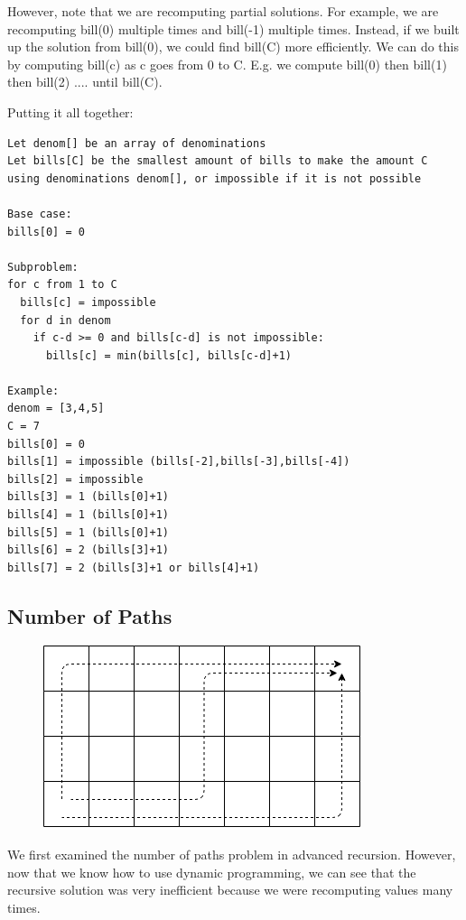 \documentclass[11pt,oneside]{book}
\makeatletter
\def\maxwidth#1{\ifdim\Gin@nat@width>#1 #1\else\Gin@nat@width\fi}
\makeatother
\begin{document}
However, note that we are recomputing partial solutions. For example, we are recomputing bill(0) multiple times and bill(-1) multiple times. Instead, if we built up the solution from bill(0), we could find bill(C) more efficiently. We can do this by computing bill(c) as c goes from 0 to C. E.g. we compute bill(0) then bill(1) then bill(2) .... until bill(C).

Putting it all together:

\begin{lstlisting}
Let denom[] be an array of denominations
Let bills[C] be the smallest amount of bills to make the amount C using denominations denom[], or impossible if it is not possible

Base case:
bills[0] = 0

Subproblem:
for c from 1 to C
  bills[c] = impossible
  for d in denom
    if c-d >= 0 and bills[c-d] is not impossible:
      bills[c] = min(bills[c], bills[c-d]+1)

Example:
denom = [3,4,5]
C = 7
bills[0] = 0
bills[1] = impossible (bills[-2],bills[-3],bills[-4])
bills[2] = impossible 
bills[3] = 1 (bills[0]+1)
bills[4] = 1 (bills[0]+1)
bills[5] = 1 (bills[0]+1)
bills[6] = 2 (bills[3]+1)
bills[7] = 2 (bills[3]+1 or bills[4]+1)
\end{lstlisting}

\subsection{Number of Paths}

\vspace{5px}\begin{figure}[H]\centering
        \includegraphics[width=0.66\maxwidth{\textwidth}]{recursion_grid.png}
        \end{figure}

We first examined the number of paths problem in advanced recursion. However, now that we know how to use dynamic programming, we can see that the recursive solution was very inefficient because we were recomputing values many times.
\end{document}
